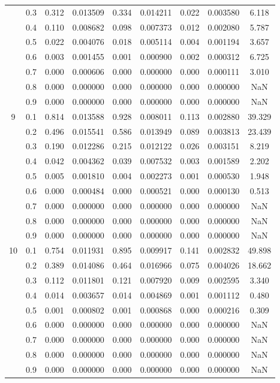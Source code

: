 \begin{longtable}{ | c | c || c | c | c | c | c | c | c | }
 & 0.3 & 0.312 & 0.013509 & 0.334 & 0.014211 & 0.022 & 0.003580 & 6.118 \\
 & 0.4 & 0.110 & 0.008682 & 0.098 & 0.007373 & 0.012 & 0.002080 & 5.787 \\
 & 0.5 & 0.022 & 0.004076 & 0.018 & 0.005114 & 0.004 & 0.001194 & 3.657 \\
 & 0.6 & 0.003 & 0.001455 & 0.001 & 0.000900 & 0.002 & 0.000312 & 6.725 \\
 & 0.7 & 0.000 & 0.000606 & 0.000 & 0.000000 & 0.000 & 0.000111 & 3.010 \\
 & 0.8 & 0.000 & 0.000000 & 0.000 & 0.000000 & 0.000 & 0.000000 & NaN \\
 & 0.9 & 0.000 & 0.000000 & 0.000 & 0.000000 & 0.000 & 0.000000 & NaN \\
 \hline
\multirow{9}{*}{9} & 0.1 & 0.814 & 0.013588 & 0.928 & 0.008011 & 0.113 & 0.002880 & 39.329 \\
 & 0.2 & 0.496 & 0.015541 & 0.586 & 0.013949 & 0.089 & 0.003813 & 23.439 \\
 & 0.3 & 0.190 & 0.012286 & 0.215 & 0.012122 & 0.026 & 0.003151 & 8.219 \\
 & 0.4 & 0.042 & 0.004362 & 0.039 & 0.007532 & 0.003 & 0.001589 & 2.202 \\
 & 0.5 & 0.005 & 0.001810 & 0.004 & 0.002273 & 0.001 & 0.000530 & 1.948 \\
 & 0.6 & 0.000 & 0.000484 & 0.000 & 0.000521 & 0.000 & 0.000130 & 0.513 \\
 & 0.7 & 0.000 & 0.000000 & 0.000 & 0.000000 & 0.000 & 0.000000 & NaN \\
 & 0.8 & 0.000 & 0.000000 & 0.000 & 0.000000 & 0.000 & 0.000000 & NaN \\
 & 0.9 & 0.000 & 0.000000 & 0.000 & 0.000000 & 0.000 & 0.000000 & NaN \\
 \hline
\multirow{9}{*}{10} & 0.1 & 0.754 & 0.011931 & 0.895 & 0.009917 & 0.141 & 0.002832 & 49.898 \\
 & 0.2 & 0.389 & 0.014086 & 0.464 & 0.016966 & 0.075 & 0.004026 & 18.662 \\
 & 0.3 & 0.112 & 0.011801 & 0.121 & 0.007920 & 0.009 & 0.002595 & 3.340 \\
 & 0.4 & 0.014 & 0.003657 & 0.014 & 0.004869 & 0.001 & 0.001112 & 0.480 \\
 & 0.5 & 0.001 & 0.000802 & 0.001 & 0.000868 & 0.000 & 0.000216 & 0.309 \\
 & 0.6 & 0.000 & 0.000000 & 0.000 & 0.000000 & 0.000 & 0.000000 & NaN \\
 & 0.7 & 0.000 & 0.000000 & 0.000 & 0.000000 & 0.000 & 0.000000 & NaN \\
 & 0.8 & 0.000 & 0.000000 & 0.000 & 0.000000 & 0.000 & 0.000000 & NaN \\
 & 0.9 & 0.000 & 0.000000 & 0.000 & 0.000000 & 0.000 & 0.000000 & NaN \\
 \hline
\hline
\end{longtable}
 
